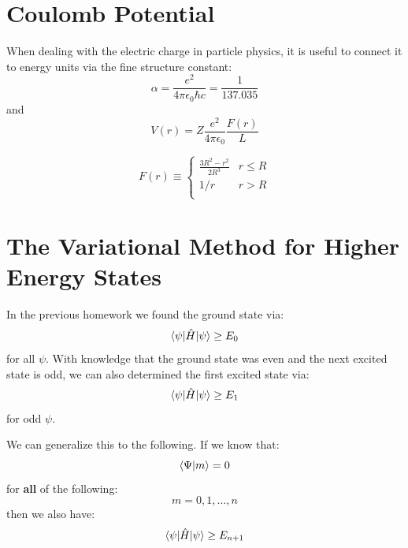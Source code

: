 \documentclass[12pt]{article}
\begin{document}
\section{Coulomb Potential}
When dealing with the electric charge in particle physics, it is useful to connect it to energy units via the fine structure constant:
$$\alpha = \frac{e^2}{4\pi\epsilon_0 \hbar c} = \frac{1}{137.035}$$
and
$$V(r) = Z\frac{e^2}{4\pi\epsilon_0} \frac{F(r)}{L}$$


$$F(r) \equiv  \begin{cases}
\frac{3R^2-r^2}{2R^3} & r \leq R \\
  1/r & r > R \\
\end{cases}
$$


\section{The Variational Method for Higher Energy States}

In the previous homework we found the ground state via:
$$\braket{\psi|\hat{H}|\psi} \geq E_0$$
for all $\psi$.  With knowledge that the ground state was even and the next excited state is odd, we can also determined the first excited state via:
$$\braket{\psi|\hat{H}|\psi} \geq E_1$$
for odd $\psi$.

We can generalize this to the following.  If we know that:
$$\braket{\Psi|m} = 0$$
for {\bf all} of the following:
$$m=0,1,\ldots,n$$
then we also have:  
$$\braket{\psi|\hat{H}|\psi} \geq E_{n+1}$$
\end{document}
